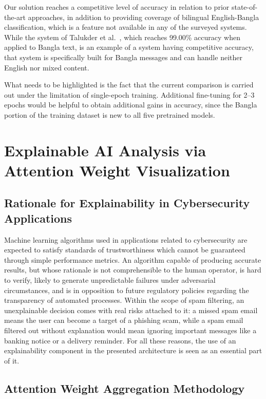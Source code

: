 \documentclass[journal]{IEEEtran}
\begin{document}
Our solution reaches a competitive level of accuracy in relation to
prior state-of-the-art approaches, in addition to providing coverage of
bilingual English-Bangla classification, which is a feature not
available in any of the surveyed systems. While the system of Talukder
et al.~\cite{ref7}, which reaches 99.00\% accuracy when applied to Bangla text,
is an example of a system having competitive accuracy, that system is
specifically built for Bangla messages and can handle neither English
nor mixed content.

What needs to be highlighted is the fact that the current comparison is
carried out under the limitation of single-epoch training. Additional
fine-tuning for 2--3 epochs would be helpful to obtain additional gains
in accuracy, since the Bangla portion of the training dataset is new to
all five pretrained models.



\section{Explainable AI Analysis via Attention Weight Visualization}

\subsection{Rationale for Explainability in Cybersecurity Applications}

Machine learning algorithms used in applications related to
cybersecurity are expected to satisfy standards of trustworthiness which
cannot be guaranteed through simple performance metrics. An algorithm
capable of producing accurate results, but whose rationale is not
comprehensible to the human operator, is hard to verify, likely to
generate unpredictable failures under adversarial circumstances, and is
in opposition to future regulatory policies regarding the transparency
of automated processes. Within the scope of spam filtering, an
unexplainable decision comes with real risks attached to it: a missed
spam email means the user can become a target of a phishing scam, while
a spam email filtered out without explanation would mean ignoring
important messages like a banking notice or a delivery reminder. For all
these reasons, the use of an explainability component in the presented
architecture is seen as an essential part of it.

\subsection{Attention Weight Aggregation Methodology}
\end{document}
